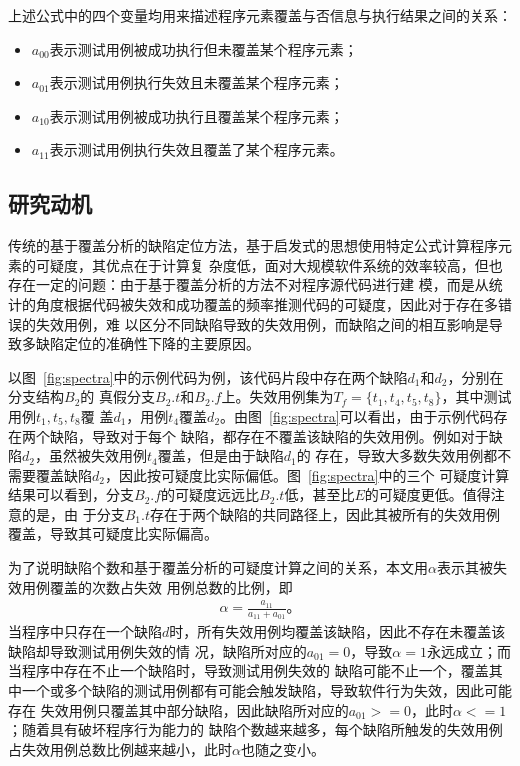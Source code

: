 上述公式中的四个变量均用来描述程序元素覆盖与否信息与执行结果之间的关系：
\begin{itemize}
  \item $a_{00}$表示测试用例被成功执行但未覆盖某个程序元素；
  \item $a_{01}$表示测试用例执行失效且未覆盖某个程序元素；
  \item $a_{10}$表示测试用例被成功执行且覆盖某个程序元素；
  \item $a_{11}$表示测试用例执行失效且覆盖了某个程序元素。
\end{itemize}

\subsection{研究动机}
传统的基于覆盖分析的缺陷定位方法，基于启发式的思想使用特定公式计算程序元素的可疑度，其优点在于计算复
杂度低，面对大规模软件系统的效率较高，但也存在一定的问题：由于基于覆盖分析的方法不对程序源代码进行建
模，而是从统计的角度根据代码被失效和成功覆盖的频率推测代码的可疑度，因此对于存在多错误的失效用例，难
以区分不同缺陷导致的失效用例，而缺陷之间的相互影响是导致多缺陷定位的准确性下降的主要原因。

以图~\ref{fig:spectra}中的示例代码为例，该代码片段中存在两个缺陷$d_1$和$d_2$，分别在分支结构$B_2$的
真假分支$B_2.t$和$B_2.f$上。失效用例集为$T_f=\{t_1, t_4, t_5, t_8\}$，其中测试用例$t_1, t_5, t_8$覆
盖$d_1$，用例$t_4$覆盖$d_2$。由图~\ref{fig:spectra}可以看出，由于示例代码存在两个缺陷，导致对于每个
缺陷，都存在不覆盖该缺陷的失效用例。例如对于缺陷$d_2$，虽然被失效用例$t_4$覆盖，但是由于缺陷$d_1$的
存在，导致大多数失效用例都不需要覆盖缺陷$d_2$，因此按可疑度比实际偏低。图~\ref{fig:spectra}中的三个
可疑度计算结果可以看到，分支$B_2.f$的可疑度远远比$B_2.t$低，甚至比$E$的可疑度更低。值得注意的是，由
于分支$B_1.t$存在于两个缺陷的共同路径上，因此其被所有的失效用例覆盖，导致其可疑度比实际偏高。

为了说明缺陷个数和基于覆盖分析的可疑度计算之间的关系，本文用$\alpha$表示其被失效用例覆盖的次数占失效
用例总数的比例，即
\begin{eqnarray}
\alpha = \frac{a_{11}}{a_{11}+a_{01}}。 \label{eq:alpha}
\end{eqnarray}
当程序中只存在一个缺陷$d$时，所有失效用例均覆盖该缺陷，因此不存在未覆盖该缺陷却导致测试用例失效的情
况，缺陷所对应的$a_{01}=0$，导致$\alpha=1$永远成立；而当程序中存在不止一个缺陷时，导致测试用例失效的
缺陷可能不止一个，覆盖其中一个或多个缺陷的测试用例都有可能会触发缺陷，导致软件行为失效，因此可能存在
失效用例只覆盖其中部分缺陷，因此缺陷所对应的$a_{01}>=0$，此时$\alpha<=1$；随着具有破坏程序行为能力的
缺陷个数越来越多，每个缺陷所触发的失效用例占失效用例总数比例越来越小，此时$\alpha$也随之变小。

